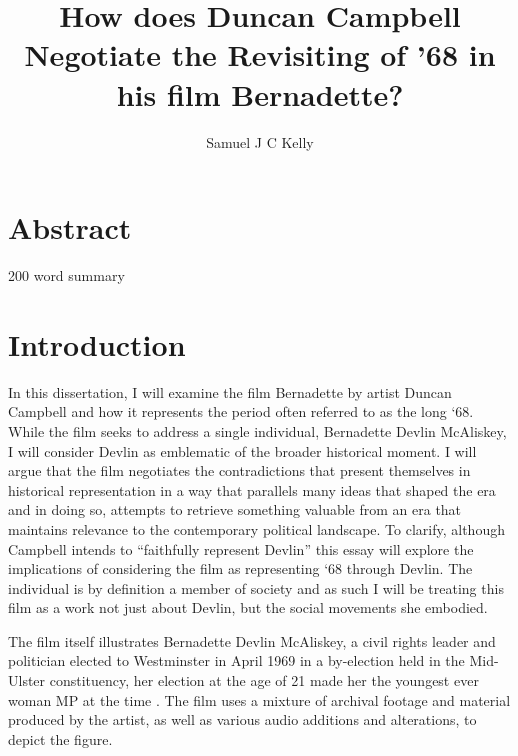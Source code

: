 \documentclass[12pt]{article}
\title{How does Duncan Campbell Negotiate the Revisiting of '68 in his film Bernadette?}
\author{Samuel J C Kelly}
\begin{document}

\frenchspacing

\maketitle
\tableofcontents
\section*{Abstract}
200 word summary 

\newpage

\doublespacing
\section{Introduction}

In this dissertation, I will examine the film Bernadette \citeyear{Campbell:2008aa} by artist Duncan Campbell and how it represents the period often referred to as the long `68. While the film seeks to address a single individual, Bernadette Devlin McAliskey, I will consider Devlin as emblematic of the broader historical moment. I will argue that the film negotiates the contradictions that present themselves in historical representation in a way that parallels many ideas that shaped the era and in doing so, attempts to retrieve something valuable from an era that maintains relevance to the contemporary political landscape. To clarify, although Campbell intends to ``faithfully represent Devlin''  this essay will explore the implications of considering the film as representing `68 through Devlin. The individual is by definition a member of society \cite{Carr:2001aa} and as such I will be treating this film as a work not just about Devlin, but the social movements she embodied.

The film itself illustrates Bernadette Devlin McAliskey, a civil rights leader and politician elected to Westminster in April 1969 in a by-election held in the Mid-Ulster constituency, her election at the age of 21 made her the youngest ever woman MP at the time \cite{Walker:2018aa}. The film uses a mixture of archival footage and material produced by the artist, as well as various audio additions and alterations, to depict the figure.
\end{document}
